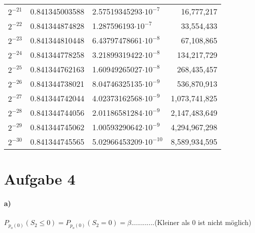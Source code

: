 \documentclass{article}
\begin{document}
\begin{table}[h]
\begin{tabular}{lllr}
					$2^{-21}$            & 0.841345003588                & 2.57519345293$\cdot 10^{-7}$ & 16,777,217                                            \\
					$2^{-22}$            & 0.841344874828                & 1.287596193$\cdot 10^{-7}$  & 33,554,433                                            \\
					$2^{-23}$            & 0.841344810448                & 6.43797478661$\cdot 10^{-8}$ & 67,108,865                                            \\
					$2^{-24}$            & 0.841344778258                & 3.21899319422$\cdot 10^{-8}$ & 134,217,729                                           \\
					$2^{-25}$            & 0.841344762163                & 1.60949265027$\cdot 10^{-8}$ & 268,435,457                                           \\
					$2^{-26}$            & 0.841344738021                & 8.04746325135$\cdot 10^{-9}$  & 536,870,913                                           \\
					$2^{-27}$            & 0.841344742044                & 4.02373162568$\cdot 10^{-9}$  & 1,073,741,825                                         \\
					$2^{-28}$            & 0.841344744056                & 2.01186581284$\cdot 10^{-9}$  & 2,147,483,649                                         \\
					$2^{-29}$            & 0.841344745062                & 1.00593290642$\cdot 10^{-9}$  & 4,294,967,298                                         \\
					$2^{-30}$            & 0.841344745565                & 5.02966453209$\cdot 10^{-10}$ & 8,589,934,595                                        
				\end{tabular}
			\end{table}
		
		
		
		\section*{Aufgabe 4}
			\paragraph*{a)}
				$P_{p_o(0)}(S_2 \leq 0) = P_{p_o(0)}(S_2 = 0) = \beta$............(Kleiner als 0 ist nicht möglich)\\[1.5em]
				
\end{document}
